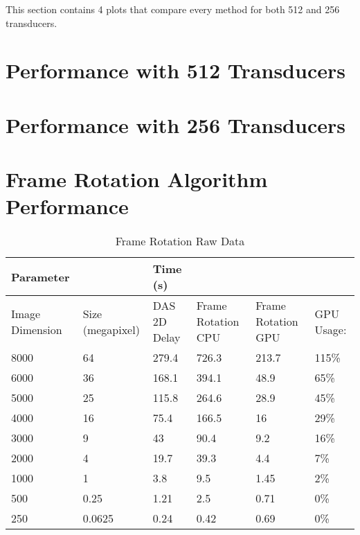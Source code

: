 \label{app:supp_plots}
\graphicspath{{C:/Users/cason/OneDrive/Documents/PSU/Project/02_MATLAB/05_DataOut/}}

This section contains 4 plots that compare every method for both 512 and 256 transducers.

\section{Performance with 512 Transducers}
\label{appA:512_transducerfigs}

\section{Performance with 256 Transducers}
\label{appA:256_transducerfigs}

\section{Frame Rotation Algorithm Performance}
\label{appA:rotation_data}
\begin{table}[!ht]
    \caption{Frame Rotation Raw Data}
    \centering
    \begin{tabular}{|p{0.75in}|p{1in}|p{1in}|p{1in}|p{1in}|p{0.6in}|}
    \hline
        Parameter & ~ & Time (s) & ~ & ~ & ~ \\ \hline
        Image Dimension & Size (megapixel) & DAS 2D Delay & Frame Rotation CPU & Frame Rotation GPU & GPU Usage:\\ \hline
        8000 & 64 & 279.4 & 726.3 & 213.7 & 115\% \\ \hline
        6000 & 36 & 168.1 & 394.1 & 48.9 & 65\% \\ \hline
        5000 & 25 & 115.8 & 264.6 & 28.9 & 45\% \\ \hline
        4000 & 16 & 75.4 & 166.5 & 16 & 29\% \\ \hline
        3000 & 9 & 43 & 90.4 & 9.2 & 16\% \\ \hline
        2000 & 4 & 19.7 & 39.3 & 4.4 & 7\%  \\ \hline
        1000 & 1 & 3.8 & 9.5 & 1.45 & 2\% \\ \hline
        500 & 0.25 & 1.21 & 2.5 & 0.71 & 0\% \\ \hline
        250 & 0.0625 & 0.24 & 0.42 & 0.69 & 0\% \\ \hline
    \end{tabular}
\end{table}